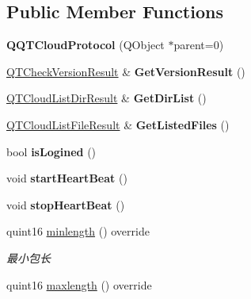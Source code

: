 \subsection*{Public Member Functions}
\begin{DoxyCompactItemize}
\item 
\mbox{\label{class_q_q_t_cloud_protocol_a0959896f933ec6a2e830b27d7866e15e}} 
{\bfseries Q\+Q\+T\+Cloud\+Protocol} (Q\+Object $\ast$parent=0)
\item 
\mbox{\label{class_q_q_t_cloud_protocol_ac189978e1582ff779e20edf8c5252e65}} 
\mbox{\hyperlink{structtag_q_t_check_version_result}{Q\+T\+Check\+Version\+Result}} \& {\bfseries Get\+Version\+Result} ()
\item 
\mbox{\label{class_q_q_t_cloud_protocol_a2ca13c173cba26841e7184c5476106d0}} 
\mbox{\hyperlink{structtag_q_t_cloud_list_dir_result}{Q\+T\+Cloud\+List\+Dir\+Result}} \& {\bfseries Get\+Dir\+List} ()
\item 
\mbox{\label{class_q_q_t_cloud_protocol_a58d781f27f2413cbf6a34ff1e0963ab3}} 
\mbox{\hyperlink{structtag_q_t_cloud_list_file_result}{Q\+T\+Cloud\+List\+File\+Result}} \& {\bfseries Get\+Listed\+Files} ()
\item 
\mbox{\label{class_q_q_t_cloud_protocol_a87e1142a6ac1243726657ea4a152244a}} 
bool {\bfseries is\+Logined} ()
\item 
\mbox{\label{class_q_q_t_cloud_protocol_a2de0e097070bc175fff23bf5d61752e4}} 
void {\bfseries start\+Heart\+Beat} ()
\item 
\mbox{\label{class_q_q_t_cloud_protocol_ad3c249c9b2d1c41fae3aa97202a39534}} 
void {\bfseries stop\+Heart\+Beat} ()
\item 
quint16 \mbox{\hyperlink{class_q_q_t_cloud_protocol_a138211e39906229a3e5c6c623d04cac9}{minlength}} () override
\begin{DoxyCompactList}\small\item\em 最小包长 \end{DoxyCompactList}\item 
quint16 \mbox{\hyperlink{class_q_q_t_cloud_protocol_a3d0c9c59e983a8e8f315c3ad174154fa}{maxlength}} () override

\end{DoxyCompactItemize}
